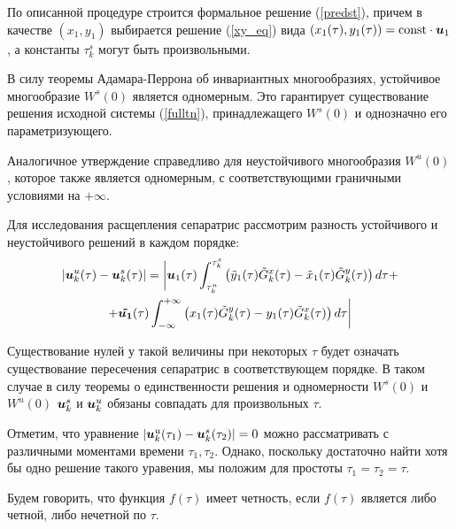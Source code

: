 
По описанной процедуре строится формальное решение (\ref{predst}), причем в качестве $(x_1,y_1)$ выбирается решение (\ref{xy_eq}) вида $\left( x_1(\tau), y_1(\tau) \right) = \text{const} \cdot \boldsymbol{u}_1$, а константы $\tau_k^{s}$ могут быть произвольными.

В силу теоремы Адамара-Перрона об инвариантных многообразиях, устойчивое многообразие $W^s(0)$ является одномерным. Это гарантирует существование решения исходной системы (\ref{fulltn}), принадлежащего $W^s(0)$ и однозначно его параметризующего.

Аналогичное утверждение справедливо для неустойчивого многообразия $W^u(0)$, которое также является одномерным, с соответствующими граничными условиями на $+\infty$.

Для исследования расщепления сепаратрис рассмотрим разность устойчивого и неустойчивого решений в каждом порядке:
\begin{multline}
        |\boldsymbol{u}_k^u(\tau)-\boldsymbol{u}_k^s(\tau)| = \bigg| \boldsymbol{u}_1(\tau)\int_{\tau^u_k}^{\tau^s_k} \left( \tilde y_1(\tau) \tilde G_k^x(\tau) - \tilde x_1(\tau) \tilde G_k^y(\tau) \right) d \tau + \\
        +\boldsymbol{ \tilde{u_1}}(\tau) \int_{-\infty}^{+\infty} \left( x_1(\tau) \tilde G_k^y(\tau) - y_1(\tau) \tilde G_k^x(\tau) \right) d \tau \bigg|
\label{rasshep}
\end{multline}

Существование нулей у такой величины при некоторых $\tau$ будет означать существование пересечения сепаратрис в соответствующем порядке. В таком случае в силу теоремы о единственности решения и одномерности $W^s(0)$ и $W^u(0)$ $\boldsymbol{u}_k^s$ и $\boldsymbol{u}_k^u$ обязаны совпадать для произвольных $\tau$.

Отметим, что уравнение $|\boldsymbol{u}_k^u(\tau_1)-\boldsymbol{u}_k^s(\tau_2)|=0$ можно рассматривать с различными моментами времени $\tau_1, \tau_2$. Однако, поскольку достаточно найти хотя бы одно решение такого уравения, мы положим  для простоты $\tau_1=\tau_2=\tau$.


\begin{dfn}
Будем говорить, что функция $f(\tau)$ имеет четность, если $f(\tau)$ является либо четной, либо нечетной по $\tau$.
\end{dfn}

